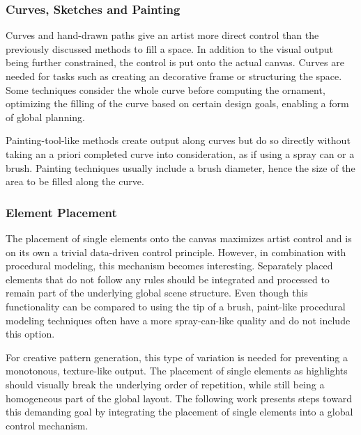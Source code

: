 \subsubsection{Curves, Sketches and Painting}
\label{subsubsec:commonly_used_control_mechanisms_curves}

Curves and hand-drawn paths give an artist more direct control than the previously discussed methods to fill a space. In addition to the visual output being further constrained, the control is put onto the actual canvas. Curves are needed for tasks such as creating an decorative frame or structuring the space. Some techniques consider the whole curve before computing the ornament, optimizing the filling of the curve based on certain design goals, enabling a form of global planning.

Painting-tool-like methods create output along curves but do so directly without taking an a priori completed curve into consideration, as if using a spray can or a brush. Painting techniques usually include a brush diameter, hence the size of the area to be filled along the curve.

\subsubsection{Element Placement}
\label{subsubsec:commonly_used_control_mechanisms_elements}

The placement of single elements onto the canvas maximizes artist control and is on its own a trivial data-driven control principle. However, in combination with procedural modeling, this mechanism becomes interesting. Separately placed elements that do not follow any rules should be integrated and processed to remain part of the underlying global scene structure. Even though this functionality can be compared to using the tip of a brush, paint-like procedural modeling techniques often have a more spray-can-like quality \cite{mech_2012_tdf} and do not include this option.

For creative pattern generation, this type of variation is needed for preventing a monotonous, texture-like output. The placement of single elements as highlights should visually break the underlying order of repetition, while still being a homogeneous part of the global layout. The following work presents steps toward this demanding goal by integrating the placement of single elements into a global control mechanism.



